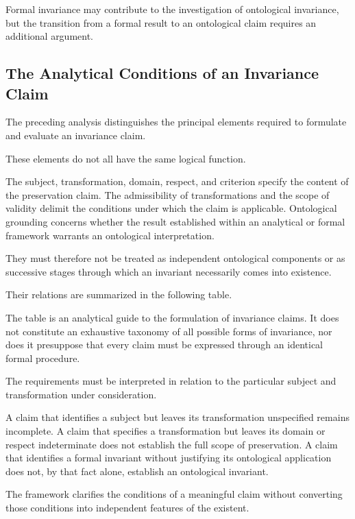 Formal invariance may contribute to
the investigation of ontological
invariance, but the transition from
a formal result to an ontological
claim requires an additional argument.

\subsection{The Analytical Conditions of an Invariance Claim}

The preceding analysis distinguishes
the principal elements required to
formulate and evaluate an invariance
claim.

These elements do not all have the
same logical function.

The subject, transformation, domain,
respect, and criterion specify the
content of the preservation claim.
The admissibility of transformations
and the scope of validity delimit
the conditions under which the claim
is applicable. Ontological grounding
concerns whether the result established
within an analytical or formal
framework warrants an ontological
interpretation.

They must therefore not be treated
as independent ontological components
or as successive stages through which
an invariant necessarily comes into
existence.

Their relations are summarized in
the following table.



The table is an analytical guide
to the formulation of invariance
claims. It does not constitute an
exhaustive taxonomy of all possible
forms of invariance, nor does it
presuppose that every claim must
be expressed through an identical
formal procedure.

The requirements must be interpreted
in relation to the particular subject
and transformation under consideration.

A claim that identifies a subject
but leaves its transformation
unspecified remains incomplete.
A claim that specifies a transformation
but leaves its domain or respect
indeterminate does not establish
the full scope of preservation.
A claim that identifies a formal
invariant without justifying its
ontological application does not,
by that fact alone, establish an
ontological invariant.

The framework clarifies the conditions
of a meaningful claim without
converting those conditions into
independent features of the existent.

